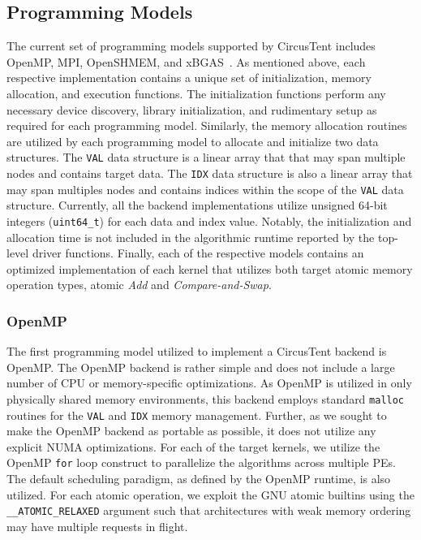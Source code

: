 \subsection{Programming Models}
\label{subsec:programming_models}

The current set of programming models supported by CircusTent includes OpenMP, MPI, OpenSHMEM, and xBGAS~\cite{leidel2018xbgas}.
As mentioned above, each respective implementation contains a unique set of initialization, memory allocation, and execution functions.
The initialization functions perform any necessary device discovery, library initialization, and rudimentary setup as required for each programming model.
Similarly, the memory allocation routines are utilized by each programming model to allocate and initialize two data structures.
The \texttt{VAL} data structure is a linear array that that may span multiple nodes and contains target data.
The \texttt{IDX} data structure is also a linear array that may span multiples nodes and contains indices within the scope of the \texttt{VAL} data structure.
Currently, all the backend implementations utilize unsigned 64-bit integers (\texttt{uint64\_t}) for each data and index value.  
Notably, the initialization and allocation time is not included in the algorithmic runtime reported by the top-level driver functions.
Finally, each of the respective models contains an optimized implementation of each kernel that utilizes both target atomic memory operation types, atomic \textit{Add} and \textit{Compare-and-Swap}.

\subsubsection{OpenMP}
\label{subsubsec:openmp}

The first programming model utilized to implement a CircusTent backend is OpenMP.  
The OpenMP backend is rather simple and does not include a large number of CPU or memory-specific optimizations.
As OpenMP is utilized in only physically shared memory environments, this backend employs standard \texttt{malloc} routines for the \texttt{VAL} and \texttt{IDX} memory management.
Further, as we sought to make the OpenMP backend as portable as possible, it does not utilize any explicit NUMA optimizations. 
For each of the target kernels, we utilize the OpenMP \texttt{for} loop construct to parallelize the algorithms across multiple PEs.
The default scheduling paradigm, as defined by the OpenMP runtime, is also utilized.
For each atomic operation, we exploit the GNU atomic builtins using the \texttt{\_\_ATOMIC\_RELAXED} argument such that architectures with weak memory ordering may have multiple requests in flight.  

